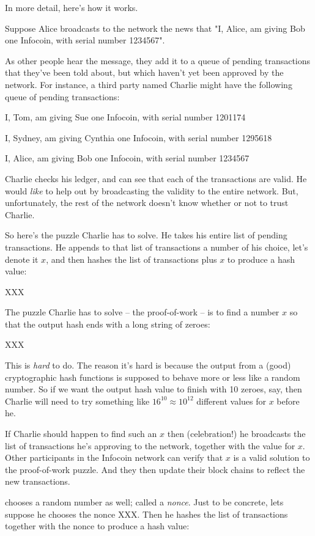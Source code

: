 \documentclass[12pt]{book}
\begin{document}
In more detail, here's how it works.

Suppose Alice broadcasts to the network the news that "I, Alice, am
giving Bob one Infocoin, with serial number 1234567".  

As other people hear the message, they add it to a queue of pending
transactions that they've been told about, but which haven't yet been
approved by the network.  For instance, a third party named Charlie
might have the following queue of pending transactions:

I, Tom, am giving Sue one Infocoin, with serial number 1201174

I, Sydney, am giving Cynthia one Infocoin, with serial number 1295618

I, Alice, am giving Bob one Infocoin, with serial number 1234567

Charlie checks his ledger, and can see that each of the transactions
are valid.  He would \emph{like} to help out by broadcasting the
validity to the entire network.  But, unfortunately, the rest of the
network doesn't know whether or not to trust Charlie.

So here's the puzzle Charlie has to solve.  He takes his entire list
of pending transactions.  He appends to that list of transactions a
number of his choice, let's denote it $x$, and then hashes the list of
transactions plus $x$ to produce a hash value:

XXX

The puzzle Charlie has to solve -- the proof-of-work -- is to find a
number $x$ so that the output hash ends with a long string of zeroes:

XXX

This is \emph{hard} to do.  The reason it's hard is because the output
from a (good) cryptographic hash functions is supposed to behave more
or less like a random number.  So if we want the output hash value to
finish with 10 zeroes, say, then Charlie will need to try something
like $16^{10} \approx 10^{12}$ different values for $x$ before he.

If Charlie should happen to find such an $x$ then (celebration!)  he
broadcasts the list of transactions he's approving to the network,
together with the value for $x$.  Other participants in the Infocoin
network can verify that $x$ is a valid solution to the proof-of-work
puzzle.  And they then update their block chains to reflect the new
transactions.


chooses a random number as well; called
a \emph{nonce}.  Just to be concrete, lets suppose he chooses the
nonce XXX.  Then he hashes the list of transactions together with the
nonce to produce a hash value:
\end{document}
